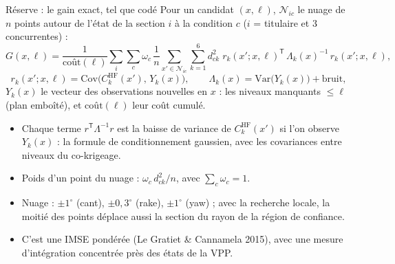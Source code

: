 \documentclass[aspectratio=169,10pt]{beamer}
\newcommand{\Var}{\mathrm{Var}}
\newcommand{\tp}{^{\mathsf{T}}}
\begin{document}
\appendix
\begin{frame}{Réserve : le gain exact, tel que codé}
\small
Pour un candidat $(x, \ell)$, $\mathcal N_{ic}$ le nuage de $n$ points autour de l'état de la section $i$ à la
condition $c$ ($i$ = titulaire et 3 concurrentes) :
\[
  G(x, \ell) = \frac{1}{\mathrm{coût}(\ell)} \sum_{i} \sum_c \omega_c\,
  \frac1n \sum_{x' \in \mathcal N_{ic}} \sum_{k=1}^{6} d_{ck}^2\;
  r_k(x'; x, \ell)\tp\, \Lambda_k(x)^{-1}\, r_k(x'; x, \ell),
\]
\[
  r_k(x'; x, \ell) = \mathrm{Cov}\big(C_k^{\text{HF}}(x'),\, Y_{k}(x)\big),
  \qquad \Lambda_k(x) = \Var\big(Y_{k}(x)\big) + \text{bruit},
\]
$Y_k(x)$ le vecteur des observations nouvelles en $x$ : les niveaux manquants $\le \ell$ (plan emboîté), et
$\mathrm{coût}(\ell)$ leur coût cumulé.
\begin{itemize}\setlength{\itemsep}{2pt}
  \item Chaque terme $r\tp\Lambda^{-1}r$ est la baisse de variance de $C_k^{\text{HF}}(x')$ si l'on observe $Y_k(x)$ :
        la formule de conditionnement gaussien, avec les covariances entre niveaux du co-krigeage.
  \item Poids d'un point du nuage : $\omega_c\, d_{ck}^2 / n$, avec $\sum_c \omega_c = 1$.
  \item Nuage : $\pm1^\circ$ (cant), $\pm0{,}3^\circ$ (rake), $\pm1^\circ$ (yaw) ; avec la recherche locale, la moitié
        des points déplace aussi la section du rayon de la région de confiance.
  \item C'est une IMSE pondérée (Le Gratiet \& Cannamela 2015), avec une mesure d'intégration concentrée près des
        états de la VPP.
\end{itemize}
\end{frame}
\end{document}

